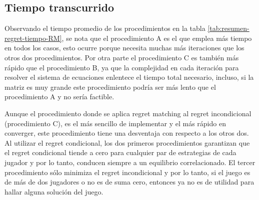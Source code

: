 \subsection{Tiempo transcurrido}

Observando el tiempo promedio de los procedimientos en la tabla \ref{tab:resumen-regret-tiempo-RM}, se nota que el procedimiento A es el que emplea más tiempo en todos los casos, esto ocurre porque necesita muchas más iteraciones que los otros dos procedimientos. Por otra parte el procedimiento C es también más rápido que el procedimiento B, ya que la complejidad en cada iteración para resolver el sistema de ecuaciones enlentece el tiempo total necesario, incluso, si la matriz es muy grande este procedimiento podría ser más lento que el procedimiento A y no sería factible.

Aunque el procedimiento donde se aplica regret matching al regret incondicional (procedimiento C), es el más sencillo de implementar y el más rápido en converger, este procedimiento tiene una desventaja con respecto a los otros dos. Al utilizar el regret condicional, los dos primeros procedimientos garantizan que el regret condicional tiende a cero para cualquier par de estrategias de cada jugador y por lo tanto, conducen siempre a un equilibrio correlacionado. El tercer procedimiento sólo minimiza el regret incondicional y por lo tanto, si el juego es de más de dos jugadores o no es de suma cero, entonces ya no es de utilidad para hallar alguna solución del juego.


